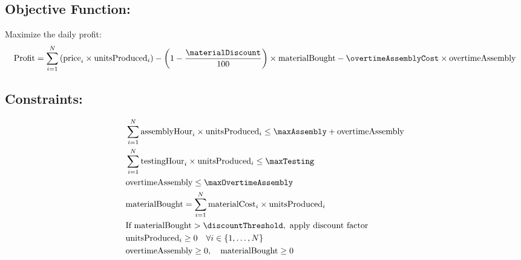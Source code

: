 \documentclass{article}
\begin{document}
\subsection*{Objective Function:}
Maximize the daily profit:
\begin{align*}
    \text{Profit} = \sum_{i=1}^{N} \left( \text{price}_i \times \text{unitsProduced}_i \right) 
    - \left( 1 - \frac{\materialDiscount}{100} \right) \times \text{materialBought} 
    - \overtimeAssemblyCost \times \text{overtimeAssembly}
\end{align*}

\subsection*{Constraints:}
\begin{align*}
    &\sum_{i=1}^{N} \text{assemblyHour}_i \times \text{unitsProduced}_i \leq \maxAssembly + \text{overtimeAssembly} \\
    &\sum_{i=1}^{N} \text{testingHour}_i \times \text{unitsProduced}_i \leq \maxTesting \\
    &\text{overtimeAssembly} \leq \maxOvertimeAssembly \\
    &\text{materialBought} = \sum_{i=1}^{N} \text{materialCost}_i \times \text{unitsProduced}_i \\
    &\text{If } \text{materialBought} > \discountThreshold, \text{ apply discount factor} \\
    &\text{unitsProduced}_i \geq 0 \quad \forall i \in \{1, \ldots, N\} \\
    &\text{overtimeAssembly} \geq 0, \quad \text{materialBought} \geq 0 \\
\end{align*}
\end{document}
